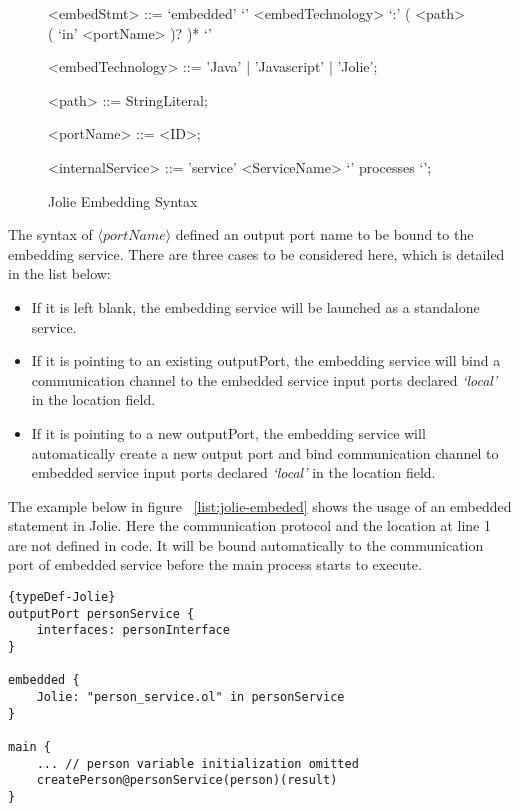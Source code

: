 \begin{figure}[ht]
    \begin{framed}
        \begin{grammar}
            <embedStmt> ::= `embedded' `{' <embedTechnology> `:' ( <path> ( `in' <portName> )? )* `}'

            <embedTechnology> ::= 'Java' | 'Javascript' | 'Jolie';

            <path> ::= StringLiteral;

            <portName> ::= <ID>;

            <internalService>
            ::= 'service' <ServiceName> `{' processes `}';
        \end{grammar}
    \end{framed}
    \caption{Jolie Embedding Syntax}
    \label{fig:embedded-syntax}
\end{figure}

The syntax of \(\langle portName \rangle\) defined an output port name to be bound to the embedding service. There are three cases to be considered here, which is detailed in the list below:

\begin{itemize}
    \item If it is left blank, the embedding service will be launched as a standalone service.
    \item If it is pointing to an existing outputPort, the embedding service will bind a communication channel to the embedded service input ports declared \textit{`local'} in the location field.
    \item If it is pointing to a new outputPort, the embedding service will automatically create a new output port and bind communication channel to embedded service input ports declared \textit{`local'} in the location field.
\end{itemize}

The example below in figure ~\ref{list:jolie-embeded} shows the usage of an embedded statement in Jolie. Here the communication protocol and the location at line 1 are not defined in code. It will be bound automatically to the communication port of embedded service before the main process starts to execute. 

\begin{listing}[ht]

\lstset{language=Jolie,
    style=codeStyle,
    numbers=left,
    firstnumber=1
}
\begin{lstlisting}[frame=tlrb, caption= {Jolie Embedding example}, label={list:jolie-embeded} ]{typeDef-Jolie}
outputPort personService {
    interfaces: personInterface
}

embedded {
    Jolie: "person_service.ol" in personService
}

main {
    ... // person variable initialization omitted
    createPerson@personService(person)(result)
}
\end{lstlisting}
\end{listing}

\FloatBarrier
